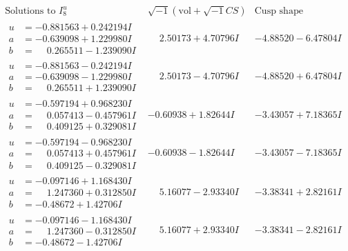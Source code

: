 \documentclass[1p]{elsarticle_modified}
\theoremstyle{definition}
\newcommand{\I}{\sqrt{-1}}
\begin{document}
$$\begin{array}{c|c|c}  
\text{Solutions to }I^u_{8}& \I (\text{vol} + \sqrt{-1}CS) & \text{Cusp shape}\\
 \hline 
\begin{aligned}
u &= -0.881563 + 0.242194 I \\
a &= -0.639098 + 1.229980 I \\
b &= \phantom{-}0.265511 - 1.239090 I\end{aligned}
 & \phantom{-}2.50173 + 4.70796 I & -4.88520 - 6.47804 I \\ \hline\begin{aligned}
u &= -0.881563 - 0.242194 I \\
a &= -0.639098 - 1.229980 I \\
b &= \phantom{-}0.265511 + 1.239090 I\end{aligned}
 & \phantom{-}2.50173 - 4.70796 I & -4.88520 + 6.47804 I \\ \hline\begin{aligned}
u &= -0.597194 + 0.968230 I \\
a &= \phantom{-}0.057413 - 0.457961 I \\
b &= \phantom{-}0.409125 + 0.329081 I\end{aligned}
 & -0.60938 + 1.82644 I & -3.43057 + 7.18365 I \\ \hline\begin{aligned}
u &= -0.597194 - 0.968230 I \\
a &= \phantom{-}0.057413 + 0.457961 I \\
b &= \phantom{-}0.409125 - 0.329081 I\end{aligned}
 & -0.60938 - 1.82644 I & -3.43057 - 7.18365 I \\ \hline\begin{aligned}
u &= -0.097146 + 1.168430 I \\
a &= \phantom{-}1.247360 + 0.312850 I \\
b &= -0.48672 + 1.42706 I\end{aligned}
 & \phantom{-}5.16077 - 2.93340 I & -3.38341 + 2.82161 I \\ \hline\begin{aligned}
u &= -0.097146 - 1.168430 I \\
a &= \phantom{-}1.247360 - 0.312850 I \\
b &= -0.48672 - 1.42706 I\end{aligned}
 & \phantom{-}5.16077 + 2.93340 I & -3.38341 - 2.82161 I \\ \hline\begin{aligned}

\end{aligned}
\end{array}$$
\end{document}

